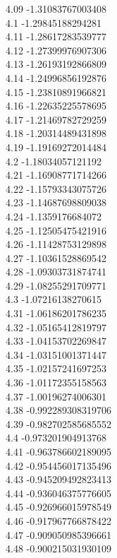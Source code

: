 {4.09	-1.31083767003408\\
4.1	-1.29845188294281\\
4.11	-1.28617283539777\\
4.12	-1.27399976907306\\
4.13	-1.26193192866809\\
4.14	-1.24996856192876\\
4.15	-1.23810891966821\\
4.16	-1.22635225578695\\
4.17	-1.21469782729259\\
4.18	-1.20314489431898\\
4.19	-1.19169272014484\\
4.2	-1.18034057121192\\
4.21	-1.16908771714266\\
4.22	-1.15793343075726\\
4.23	-1.14687698809038\\
4.24	-1.1359176684072\\
4.25	-1.12505475421916\\
4.26	-1.11428753129898\\
4.27	-1.10361528869542\\
4.28	-1.09303731874741\\
4.29	-1.08255291709771\\
4.3	-1.07216138270615\\
4.31	-1.06186201786235\\
4.32	-1.05165412819797\\
4.33	-1.04153702269847\\
4.34	-1.03151001371447\\
4.35	-1.02157241697253\\
4.36	-1.01172355158563\\
4.37	-1.00196274006301\\
4.38	-0.992289308319706\\
4.39	-0.982702585685552\\
4.4	-0.973201904913768\\
4.41	-0.963786602189095\\
4.42	-0.954456017135496\\
4.43	-0.945209492823413\\
4.44	-0.936046375776605\\
4.45	-0.926966015978549\\
4.46	-0.917967766878422\\
4.47	-0.909050985396661\\
4.48	-0.900215031930109\\
}
